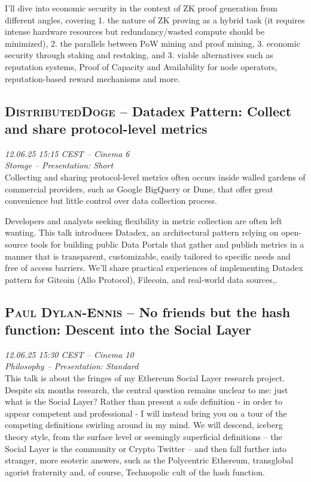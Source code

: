 I'll dive into economic security in the context of ZK proof generation from different angles, covering 1. the nature of ZK proving as a hybrid task (it requires intense hardware resources but redundancy/wasted compute should be minimized), 2. the parallels between PoW mining and proof mining, 3. economic security through staking and restaking, and 3. viable alternatives such as reputation systems, Proof of Capacity and Availability for node operators, reputation-based reward mechanisms and more.

\clearpage
\subsection {\textsc{DistributedDoge}  -- Datadex Pattern: Collect and share protocol-level metrics} \noindent \textit {12.06.25 15:15 CEST -- Cinema 6\\ Storage -- Presentation: Short}\\[1em] Collecting and sharing protocol-level metrics often occurs inside walled gardens of commercial providers, such as Google BigQuery or Dune, that offer great convenience but little control over data collection process.

Developers and analysts seeking flexibility in metric collection are often left wanting. This talk introduces Datadex, an architectural pattern relying on open-source tools for building public Data Portals that gather and publish metrics in a manner that is transparent, customizable, easily tailored to specific needs and free of access barriers. We’ll share practical experiences of implementing Datadex pattern for Gitcoin (Allo Protocol), Filecoin, and real-world data sources,.

\clearpage
\subsection {\textsc{Paul Dylan-Ennis}  -- No friends but the hash function: Descent into the Social Layer} \noindent \textit {12.06.25 15:30 CEST -- Cinema 10\\ Philosophy -- Presentation: Standard}\\[1em] This talk is about the fringes of my Ethereum Social Layer research project. Despite six months research, the central question remains unclear to me: just what is the Social Layer? Rather than present a safe definition - in order to appear competent and professional - I will instead bring you on a tour of the competing definitions swirling around in my mind. We will descend, iceberg theory style, from the surface level or seemingly superficial definitions – the Social Layer is the community or Crypto Twitter – and then fall further into stranger, more esoteric answers, such as the Polycentric Ethereum, transglobal agorist fraternity and, of course, Technopolic cult of the hash function.

